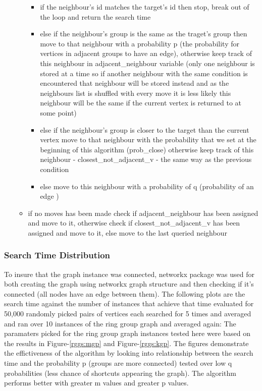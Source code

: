 \documentclass[11pt,a4paper,notitlepage]{article}
\begin{document}
\begin{itemize}
\begin{itemize}
\begin{itemize}
            \item if the neighbour's id matches the target's id then stop, break out of the loop and return the search time
            \item else if the neighbour's group is the same as the traget's group then move to that neighbour with a probability p (the probability for vertices in adjacent groups to have an edge), otherwise keep track of this neighbour in adjacent\_neighbour variable (only one neighbour is stored at a time so if another neighbour with the same condition is encountered that neighbour will be stored instead and as the neighbours list is shuffled with every move it is less likely this neighbour will be the same if the current vertex is returned to at some point)
            \item else if the neighbour's group is closer to the target than the current vertex move to that neighbour with the probability that we set at the beginning of this algorithm (prob\_close) otherwise keep track of this neighbour - closest\_not\_adjacent\_v - the same way as the previous condition
            \item else move to this neighbour with a probability of q (probability of an edge )
        \end{itemize}
        \item if no moves has been made check if adjacent\_neighbour has been assigned and move to it, otherwise check if closest\_not\_adjacent\_v has been assigned and move to it, else move to the last queried neighbour
    \end{itemize}
\end{itemize}

\subsubsection*{Search Time Distribution}
To insure that the graph instance was connected, networkx package was used for both creating the graph using networkx graph structure and then checking if it's connected (all nodes have an edge between them). The following plots are the search time against the number of instances that achieve that time evaluated for 50,000 randomly picked pairs of vertices each searched for 5 times and averaged and ran over 10 instances of the ring group graph and averaged again:
\noindent
The paramaters picked for the ring group graph instances tested here were based on the results in Figure-\ref{rggs:mgp} and Figure-\ref{rggs:kgp}. The figures demonstrate the effictiveness of the algorithm by looking into relationship between the search time and the probability p (groups are more connected) tested over low q probabilities (less chance of shortcuts appearing the graph). The algorithm performs better with greater m values and greater p values. 
\end{document}
